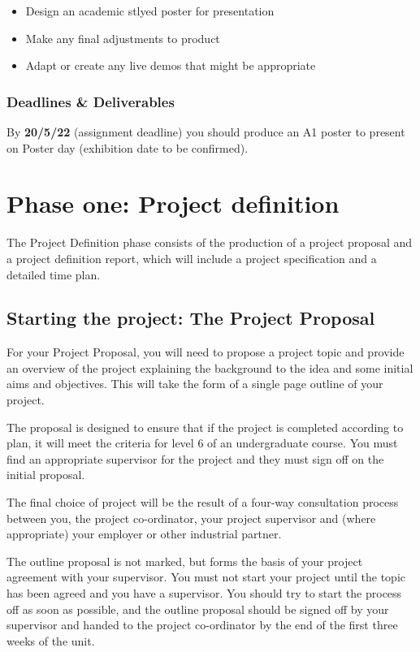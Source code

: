 \begin{itemize}
    \item Design an academic stlyed poster for presentation
    \item Make any final adjustments to product
    \item Adapt or create any live demos that might be appropriate
\end{itemize}

\subsubsection{Deadlines \& Deliverables}

By \textbf{20/5/22} (assignment deadline) you should produce an A1 poster to present on Poster day (exhibition date to be confirmed).

\section{Phase one: Project definition}

The Project Definition phase consists of the production of a project proposal and a project definition report, which will include a project specification and a detailed time plan.

\subsection{Starting the project: The Project Proposal}

For your Project Proposal, you will need to propose a project topic and provide an
overview of the project explaining the background to the idea and some initial aims and objectives. This will take the form of a single page outline of your project.

The proposal is designed to ensure that if the project is completed according to plan, it will meet the criteria for level 6 of an undergraduate course. You must find an appropriate supervisor for the project and they must sign off on the initial proposal.

The final choice of project will be the result of a four-way consultation process between you, the project co-ordinator, your project supervisor and (where  appropriate) your employer or other industrial partner.

The outline proposal is not marked, but forms the basis of your project agreement with your supervisor. You must not start your project until the topic has been agreed and you have a supervisor.
You should try to start the process off as soon as possible, and the outline proposal should be signed off by your supervisor and handed to the project co-ordinator by the end of the first three weeks of the unit.

